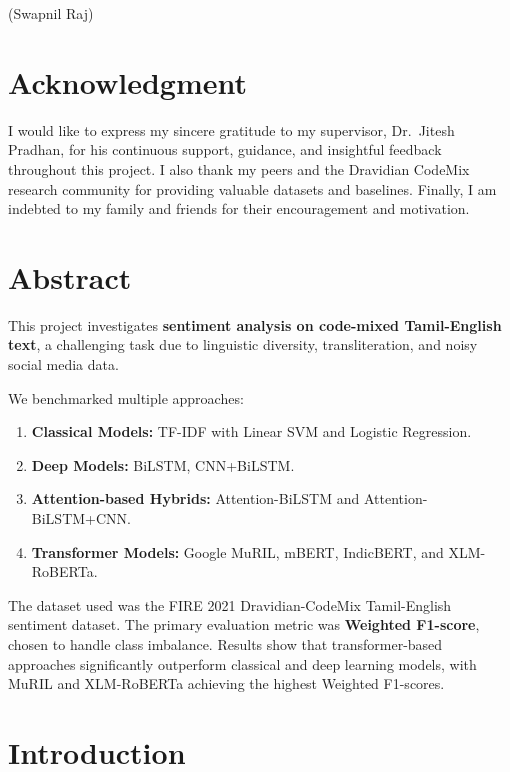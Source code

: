 \documentclass[12pt,a4paper]{article}
\begin{document}
\vspace{2cm}
\hfill (Swapnil Raj)

\clearpage

\section*{Acknowledgment}
I would like to express my sincere gratitude to my supervisor, Dr.~Jitesh Pradhan, for his continuous support, guidance, and insightful feedback throughout this project. I also thank my peers and the Dravidian CodeMix research community for providing valuable datasets and baselines. Finally, I am indebted to my family and friends for their encouragement and motivation.

\clearpage

\section*{Abstract}
This project investigates \textbf{sentiment analysis on code-mixed Tamil-English text}, a challenging task due to linguistic diversity, transliteration, and noisy social media data. 

We benchmarked multiple approaches:
\begin{enumerate}
    \item \textbf{Classical Models:} TF-IDF with Linear SVM and Logistic Regression.
    \item \textbf{Deep Models:} BiLSTM, CNN+BiLSTM.
    \item \textbf{Attention-based Hybrids:} Attention-BiLSTM and Attention-BiLSTM+CNN.
    \item \textbf{Transformer Models:} Google MuRIL, mBERT, IndicBERT, and XLM-RoBERTa.
\end{enumerate}

The dataset used was the FIRE 2021 Dravidian-CodeMix Tamil-English sentiment dataset. The primary evaluation metric was \textbf{Weighted F1-score}, chosen to handle class imbalance. Results show that transformer-based approaches significantly outperform classical and deep learning models, with MuRIL and XLM-RoBERTa achieving the highest Weighted F1-scores.

\clearpage


\section{Introduction}
\end{document}
